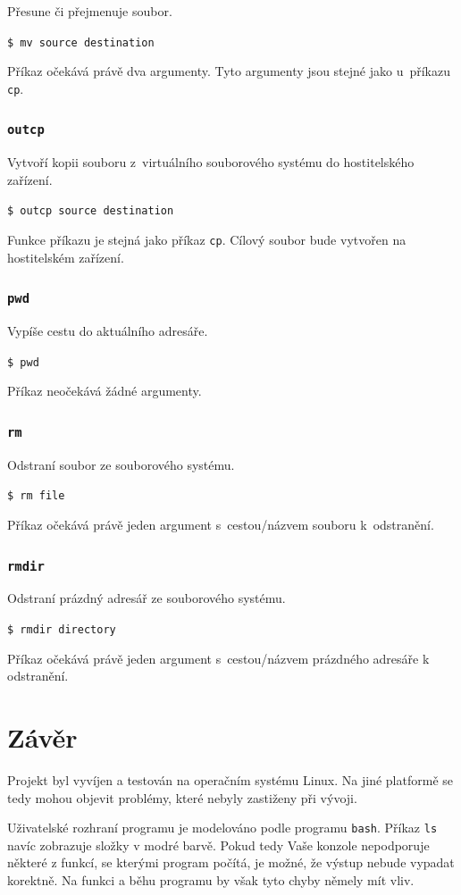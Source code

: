 \documentclass[12pt]{article}
\begin{document}
Přesune či přejmenuje soubor.

\texttt{\$ mv source destination}

Příkaz očekává právě dva argumenty. Tyto argumenty jsou stejné jako u~příkazu \texttt{cp}.

\subsubsection{\texttt{outcp}}\label{sec:outcp}

Vytvoří kopii souboru z~virtuálního souborového systému do hostitelského zařízení.

\texttt{\$ outcp source destination}

Funkce příkazu je stejná jako příkaz \texttt{cp}.
Cílový soubor bude vytvořen na hostitelském zařízení.

\subsubsection{\texttt{pwd}}\label{sec:pwd}

Vypíše cestu do aktuálního adresáře.

\texttt{\$ pwd}

Příkaz neočekává žádné argumenty.

\subsubsection{\texttt{rm}}\label{sec:rm}

Odstraní soubor ze souborového systému.

\texttt{\$ rm file}

Příkaz očekává právě jeden argument s~cestou/názvem souboru k~odstranění.

\subsubsection{\texttt{rmdir}}\label{sec:rmdir}

Odstraní prázdný adresář ze souborového systému.

\texttt{\$ rmdir directory}

Příkaz očekává právě jeden argument s~cestou/názvem prázdného adresáře k odstranění.

\section{Závěr}

Projekt byl vyvíjen a testován na operačním systému Linux.
Na jiné platformě se tedy mohou objevit problémy, které nebyly zastiženy při vývoji.

Uživatelské rozhraní programu je modelováno podle programu \texttt{bash}.
Příkaz \texttt{ls} navíc zobrazuje složky v modré barvě.
Pokud tedy Vaše konzole nepodporuje některé z funkcí, se kterými program počítá, je možné, že výstup nebude vypadat korektně.
Na funkci a běhu programu by však tyto chyby němely mít vliv.
\end{document}
